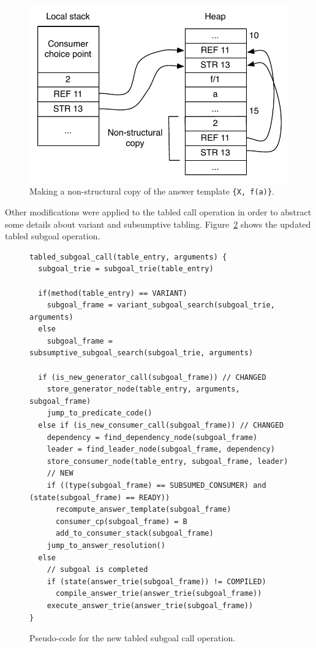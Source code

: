 \begin{figure}[H]
  \centering
    \includegraphics[scale=0.6]{non_structural_copy.pdf}
  \caption{Making a non-structural copy of the answer template \texttt{\{X,~f(a)\}}.}
  \label{fig:non_structural_copy}
\end{figure}

Other modifications were applied to the tabled call operation in order to abstract some details about
variant and subsumptive tabling. Figure~\ref{fig:tabled_subgoal_call_new} shows the updated tabled
subgoal operation.

\begin{figure}[ht]
\begin{Verbatim}
tabled_subgoal_call(table_entry, arguments) {
  subgoal_trie = subgoal_trie(table_entry)
  
  if(method(table_entry) == VARIANT)
    subgoal_frame = variant_subgoal_search(subgoal_trie, arguments)
  else
    subgoal_frame = subsumptive_subgoal_search(subgoal_trie, arguments)
  
  if (is_new_generator_call(subgoal_frame)) // CHANGED
    store_generator_node(table_entry, arguments, subgoal_frame)
    jump_to_predicate_code()
  else if (is_new_consumer_call(subgoal_frame)) // CHANGED
    dependency = find_dependency_node(subgoal_frame)
    leader = find_leader_node(subgoal_frame, dependency)
    store_consumer_node(table_entry, subgoal_frame, leader)
    // NEW
    if ((type(subgoal_frame) == SUBSUMED_CONSUMER) and (state(subgoal_frame) == READY))
      recompute_answer_template(subgoal_frame)
      consumer_cp(subgoal_frame) = B
      add_to_consumer_stack(subgoal_frame)
    jump_to_answer_resolution()
  else
    // subgoal is completed
    if (state(answer_trie(subgoal_frame)) != COMPILED)
      compile_answer_trie(answer_trie(subgoal_frame))
    execute_answer_trie(answer_trie(subgoal_frame))
}
\end{Verbatim}
\caption{Pseudo-code for the new tabled subgoal call operation.}
\label{fig:tabled_subgoal_call_new}
\end{figure}

